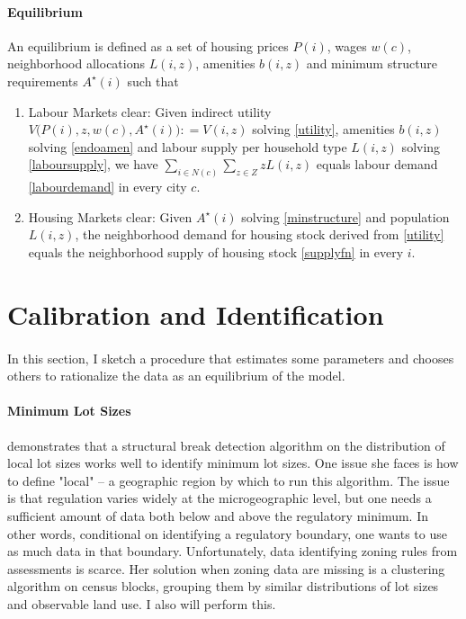 \documentclass[]{article}
\begin{document}
 
 \paragraph*{Equilibrium} An equilibrium is defined as a set of housing prices $P(i)$, wages $w(c)$, neighborhood allocations $L(i, z)$, amenities $b(i, z)$ and minimum structure requirements $A^{\star}(i)$ such that 
 \begin{enumerate}
 	\item Labour Markets clear: Given indirect utility $V\big(P(i), z, w(c), A^{\star}(i)\big) : = V(i, z)$ solving \eqref{utility}, amenities $b(i, z)$ solving \eqref{endoamen} and labour supply per household type $L(i, z)$ solving \eqref{laboursupply}, we have $\sum_{i \in N(c)}\sum_{z \in Z}zL(i, z)$ equals labour demand \eqref{labourdemand} in every city $c$.
 	
 	\item Housing Markets clear: Given $A^{\star}(i)$ solving \eqref{minstructure} and population $L(i, z)$, the neighborhood demand for housing stock derived from \eqref{utility} equals the neighborhood supply of housing stock \eqref{supplyfn} in every $i$. 
 	
 \end{enumerate}
 
 
\section{Calibration and Identification}
\paragraph*{}
In this section, I sketch a procedure that estimates some parameters and chooses others to rationalize the data as an equilibrium of the model.

\paragraph*{Minimum Lot Sizes} \cite{Song} demonstrates that a structural break detection algorithm on the distribution of local lot sizes works well to identify minimum lot sizes. One issue she faces is how to define "local" -- a geographic region by which to run this algorithm. The issue is that regulation varies widely at the microgeographic level, but one needs a sufficient amount of data both below and above the regulatory minimum. In other words, conditional on identifying a regulatory boundary, one wants to use as much data in that boundary. Unfortunately, data identifying zoning rules from assessments is scarce. Her solution when zoning data are missing is a clustering algorithm on census blocks, grouping them by similar distributions of lot sizes and observable land use. I also will perform this. 
\end{document}

